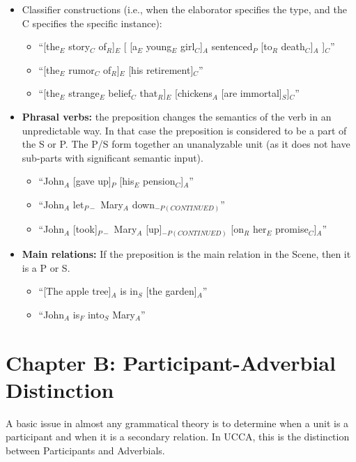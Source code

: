 \documentclass[11pt]{article}
\begin{document}
\begin{enumerate}
\begin{itemize}
\item
Classifier constructions (i.e., when the elaborator specifies the type, and the C specifies the specific instance):

\begin{itemize}
\item
``[the$_E$ story$_C$ of$_R$]$_E$ [ [a$_E$ young$_E$ girl$_C$]$_A$ sentenced$_P$ [to$_R$ death$_C$]$_A$ ]$_C$''
\item
``[the$_E$ rumor$_C$ of$_R$]$_E$ [his retirement]$_C$''
\item
``[the$_E$ strange$_E$ belief$_C$ that$_R$]$_E$ [chickens$_A$ [are immortal]$_S$]$_C$''
\end{itemize}

\item
{\bf Phrasal verbs:} the preposition changes the semantics of the verb in an unpredictable way. In that case the preposition is considered to be a part of the S or P. The P/S form together an unanalyzable unit (as it does not have sub-parts with significant semantic input).

\begin{itemize}
\item
``John$_A$ [gave up]$_P$ [his$_E$ pension$_C$]$_A$''
\item
``John$_A$ let$_{P-}$ Mary$_A$ down$_{-P(CONTINUED)}$''
\item
``John$_A$ [took]$_{P-}$ Mary$_A$ [up]$_{-P(CONTINUED)}$ [on$_R$ her$_E$ promise$_C$]$_A$''
\end{itemize}

\item
{\bf Main relations:} If the preposition is the main relation in the Scene, then it is a P or S.

\begin{itemize}
\item
``[The apple tree]$_A$ is in$_S$ [the garden]$_A$''
\item
``John$_A$ is$_F$ into$_S$ Mary$_A$''
\end{itemize}


\end{itemize}

\end{enumerate}

\section{\large Chapter B: Participant-Adverbial Distinction}\label{app:AD-distinction}

A basic issue in almost any grammatical theory is to determine when a unit is a participant and when it is a secondary relation. In UCCA, this is the distinction between Participants and Adverbials.
\end{document}

